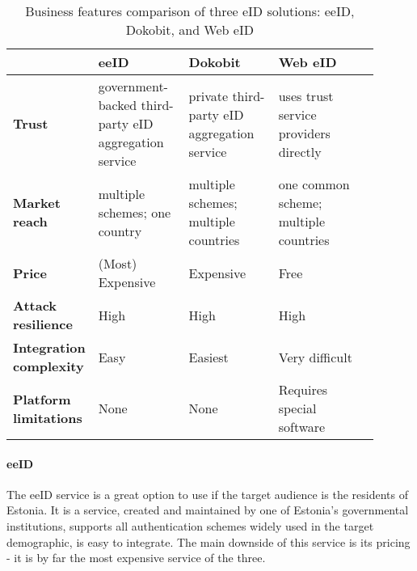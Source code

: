 \begin{table}
    \centering
    \begin{tabular}{ p{0.15\linewidth} | >{\raggedright}p{0.25\linewidth} | >{\raggedright}p{0.25\linewidth} | >{\raggedright}p{0.25\linewidth} p{0px}}
                                        & \textbf{eeID}                                         & \textbf{Dokobit}                            & \textbf{Web eID}                      & \\
        \hline
        \textbf{Trust}                  & government-backed third-party eID aggregation service & private third-party eID aggregation service & uses trust service providers directly & \\
        \hline
        \textbf{Market reach}           & multiple schemes; one country                         & multiple schemes; multiple countries        & one common scheme; multiple countries & \\
        \hline
        \textbf{Price}                  & (Most) Expensive                                      & Expensive                                   & Free                                  & \\
        \hline
        \textbf{Attack resilience}      & High                                                  & High                                        & High                                  & \\
        \hline
        \textbf{Integration complexity} & Easy                                                  & Easiest                                     & Very difficult                        & \\
        \hline
        \textbf{Platform limitations}   & None                                                  & None                                        & Requires special software             & \\
    \end{tabular}
    \caption{Business features comparison of three eID solutions: eeID, Dokobit, and Web eID}
    \label{tbl:summary-comparison-business}
\end{table}

\paragraph{eeID}

The eeID service is a great option to use if the target audience is the residents of Estonia. It is a service, created and maintained by one of Estonia's governmental institutions, supports all authentication schemes widely used in the target demographic, is easy to integrate. The main downside of this service is its pricing - it is by far the most expensive service of the three.

